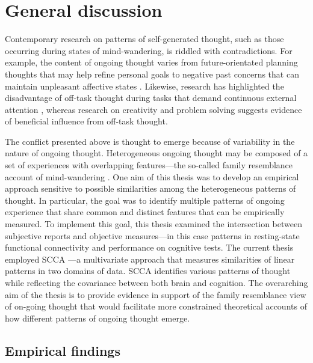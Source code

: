 \chapter{General discussion}
\label{ch:discussion}
Contemporary research on patterns of self-generated thought, such as those occurring during states of mind-wandering, is riddled with contradictions. For example, the content of ongoing thought varies from future-orientated planning thoughts that may help refine personal goals \cite{Medea2016} to negative past concerns that can maintain unpleasant affective states \cite{Killingsworth2010}. Likewise, research has highlighted the disadvantage of off-task thought during tasks that demand continuous external attention \cite{McVayJOEP2009,McVay2012}, whereas research on creativity and problem solving suggests evidence of beneficial influence from off-task thought\cite{Smeekens2016,Baird2012}.

The conflict presented above is thought to emerge because of variability in the nature of ongoing thought. Heterogeneous ongoing thought may be composed of a set of experiences with overlapping features---the so-called family resemblance account of mind-wandering \cite{Smallwood2013, Seli2018}. One aim of this thesis was to develop an empirical approach sensitive to possible similarities among the heterogeneous patterns of thought. 
In particular, the goal was to identify multiple patterns of ongoing experience that share common and distinct features that can be empirically measured. To implement this goal, this thesis examined the intersection between subjective reports and objective measures---in this case patterns in resting-state functional connectivity and performance on cognitive tests. The current thesis employed SCCA \cite{WittenSCCA2009}---a multivariate approach that measures similarities of linear patterns in two domains of data. SCCA identifies various patterns of thought while reflecting the covariance between both brain and cognition.
The overarching aim of the thesis is to provide evidence in support of the family resemblance view of on-going thought that would facilitate more constrained theoretical accounts of how different patterns of ongoing thought emerge.

\section{Empirical findings}
\label{ch:discussion:results}


